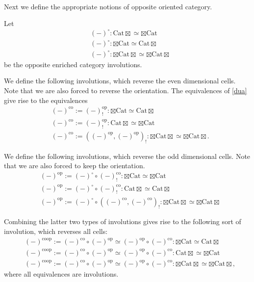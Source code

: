 \documentclass[10pt,oneside]{article}
\numberwithin{equation}{section} %
\numberwithin{figure}{section} %
\theoremstyle{plain}
\theoremstyle{definition}
\newcommand{\op}{\mathrm{op}}
\newcommand{\co}{\mathrm{co}}
\newcommand{\Cat}{\mathrm{Cat}}
\begin{document}
Next we define the appropriate notions of opposite oriented category.

\begin{definition}
    
Let
\begin{align*}
&(-)^\circ: {\Cat\boxtimes} \simeq {\boxtimes\Cat}\\
&(-)^\circ: {\boxtimes\Cat} \simeq {\Cat\boxtimes}\\
&(-)^\circ:  {\boxtimes\Cat\boxtimes} \simeq {\boxtimes\Cat\boxtimes}
\end{align*}
be the opposite enriched category involutions.	
	
\end{definition}

\begin{definition}
We define the following involutions, which reverse the even dimensional cells.
Note that we are also forced to reverse the orientation.
The equivalences of \cref{dua} give rise to the equivalences
\begin{align*}
&(-)^\co:= (-)^\op_!: {\boxtimes\Cat} \simeq {\Cat\boxtimes}\\
&(-)^\co:= (-)^\op_!: {\Cat\boxtimes} \simeq {\boxtimes\Cat}\\
&(-)^\co:= ((-)^\op, (-)^\op)_!: {\boxtimes\Cat\boxtimes} \simeq {\boxtimes\Cat\boxtimes}.
\end{align*}
\end{definition}


\begin{definition}
We define the following involutions, which reverse the odd dimensional cells.
Note that we are also forced to keep the orientation.
\begin{align*}
&(-)^\op:= (-)^\circ\circ (-)^\co_!: {\boxtimes\Cat} \simeq {\boxtimes\Cat}\\
&(-)^\op:= (-)^\circ\circ (-)^\co_!: {\Cat\boxtimes} \simeq {\Cat\boxtimes}\\
&(-)^\op :=(-)^\circ \circ ((-)^\co, (-)^\co)_!: {\boxtimes\Cat\boxtimes} \simeq {\boxtimes\Cat\boxtimes}
\end{align*}
\end{definition}

\begin{definition}
Combining the latter two types of involutions gives rise to the following sort of involution, which reverses all cells:
\begin{align*}
&{(-)^{\co\op}}:= {(-)^{\co}} \circ {(-)^{\op}} \simeq {(-)^{\op}} \circ{(-)^{\co}}:{\boxtimes\Cat} \simeq {\Cat\boxtimes}\\
&{(-)^{\co\op}}:= {(-)^{\co}} \circ {(-)^{\op}} \simeq {(-)^{\op}} \circ {(-)^{\co}}:{\Cat\boxtimes} \simeq {\boxtimes\Cat}\\
&{(-)^{\co\op}}:= {(-)^{\co}} \circ {(-)^{\op}} \simeq {(-)^{\op}} \circ {(-)^{\co}}: {\boxtimes\Cat\boxtimes} \simeq {\boxtimes\Cat\boxtimes},
\end{align*}
where all equivalences are involutions.
\end{definition}
\end{document}
